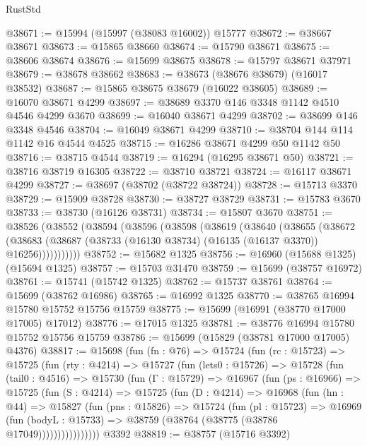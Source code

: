 \begin{lexlean}{RustStd}
\begin{coremodule}
@38671 := @15994 (@15997 (@38083 @16002)) @15777
@38672 := @38667 @38671
@38673 := @15865 @38660
@38674 := @15790 @38671
@38675 := @38606 @38674
@38676 := @15699 @38675
@38678 := @15797 @38671 @37971
@38679 := @38678 @38662
@38683 := @38673 (@38676 @38679) (@16017 @38532)
@38687 := @15865 @38675 @38679 (@16022 @38605)
@38689 := @16070 @38671 @4299
@38697 := @38689 @3370 @146 @3348 @1142 @4510 @4546 @4299 @3670
@38699 := @16040 @38671 @4299
@38702 := @38699 @146 @3348 @4546
@38704 := @16049 @38671 @4299
@38710 := @38704 @144 @114 @1142 @16 @4544 @4525
@38715 := @16286 @38671 @4299 @50 @1142 @50
@38716 := @38715 @4544
@38719 := @16294 (@16295 @38671 @50)
@38721 := @38716 @38719 @16305
@38722 := @38710 @38721
@38724 := @16117 @38671 @4299
@38727 := @38697 (@38702 (@38722 @38724))
@38728 := @15713 @3370
@38729 := @15909 @38728
@38730 := @38727 @38729
@38731 := @15783 @3670
@38733 := @38730 (@16126 @38731)
@38734 := @15807 @3670
@38751 := @38526
    (@38552
      (@38594
        (@38596
          (@38598
            (@38619
              (@38640
                (@38655
                  (@38672
                    (@38683
                      (@38687 (@38733 (@16130 @38734) (@16135 (@16137 @3370)) @16256)))))))))))
@38752 := @15682 @1325
@38756 := @16960 (@15688 @1325) (@15694 @1325)
@38757 := @15703 @31470
@38759 := @15699 (@38757 @16972)
@38761 := @15741 (@15742 @1325)
@38762 := @15737 @38761
@38764 := @15699 (@38762 @16986)
@38765 := @16992 @1325
@38770 := @38765 @16994 @15780 @15752 @15756 @15759
@38775 := @15699 (@16991 (@38770 @17000 @17005) @17012)
@38776 := @17015 @1325
@38781 := @38776 @16994 @15780 @15752 @15756 @15759
@38786 := @15699 (@15829 (@38781 @17000 @17005) @4376)
@38817 := @15698
    (fun (fn : @76) =>
    @15724
      (fun (rc : @15723) =>
      @15725
        (fun (rty : @4214) =>
        @15727
          (fun (lets0 : @15726) =>
          @15728
            (fun (tail0 : @4516) =>
            @15730
              (fun (Γ : @15729) =>
              @16967
                (fun (ps : @16966) =>
                @15725
                  (fun (S : @4214) =>
                  @15725
                    (fun (D : @4214) =>
                    @16968
                      (fun (hn : @44) =>
                      @15827
                        (fun (pns : @15826) =>
                        @15724
                          (fun (pl : @15723) =>
                          @16969
                            (fun (bodyL : @15733) =>
                            @38759 (@38764 (@38775 (@38786 @17049))))))))))))))))
    @3392
@38819 := @38757 (@15716 @3392)

\end{coremodule}
\end{lexlean}
